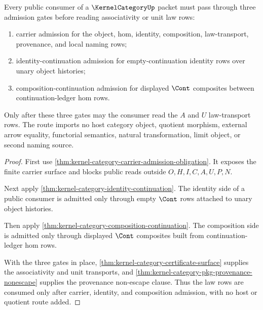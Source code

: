 \begin{theorem}
\label{thm:kernel-category-public-consumer-triad}
Every public consumer of a $\KernelCategoryUp$ packet must pass through three admission gates before reading associativity or unit law rows:
\begin{enumerate}
\item carrier admission for the object, hom, identity, composition, law-transport, provenance, and local naming rows;
\item identity-continuation admission for empty-continuation identity rows over unary object histories;
\item composition-continuation admission for displayed $\Cont$ composites between continuation-ledger hom rows.
\end{enumerate}
Only after these three gates may the consumer read the $A$ and $U$ law-transport rows. The route imports no host category object, quotient morphism, external arrow equality, functorial semantics, natural transformation, limit object, or second naming source.
\end{theorem}
\begin{proof}
First use \autoref{thm:kernel-category-carrier-admission-obligation}. It exposes the finite carrier surface and blocks public reads outside $O,H,I,C,A,U,P,N$.

Next apply \autoref{thm:kernel-category-identity-continuation}. The identity side of a public consumer is admitted only through empty $\Cont$ rows attached to unary object histories.

Then apply \autoref{thm:kernel-category-composition-continuation}. The composition side is admitted only through displayed $\Cont$ composites built from continuation-ledger hom rows.

With the three gates in place, \autoref{thm:kernel-category-certificate-surface} supplies the associativity and unit transports, and \autoref{thm:kernel-category-pkg-provenance-nonescape} supplies the provenance non-escape clause. Thus the law rows are consumed only after carrier, identity, and composition admission, with no host or quotient route added.
\end{proof}

